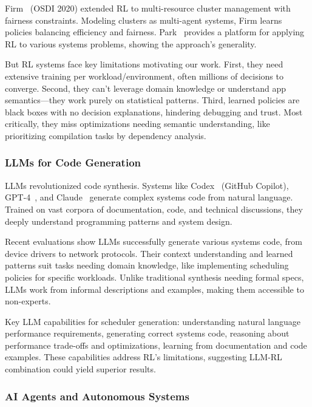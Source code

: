 Firm~\cite{qiu2020firm} (OSDI 2020) extended RL to multi-resource cluster management with fairness constraints. Modeling clusters as multi-agent systems, Firm learns policies balancing efficiency and fairness. Park~\cite{mao2019park} provides a platform for applying RL to various systems problems, showing the approach's generality.

But RL systems face key limitations motivating our work. First, they need extensive training per workload/environment, often millions of decisions to converge. Second, they can't leverage domain knowledge or understand app semantics—they work purely on statistical patterns. Third, learned policies are black boxes with no decision explanations, hindering debugging and trust. Most critically, they miss optimizations needing semantic understanding, like prioritizing compilation tasks by dependency analysis.

\subsubsection{LLMs for Code Generation}

LLMs revolutionized code synthesis. Systems like Codex~\cite{chen2021codex} (GitHub Copilot), GPT-4~\cite{openai2023gpt4}, and Claude~\cite{anthropic2024claude} generate complex systems code from natural language. Trained on vast corpora of documentation, code, and technical discussions, they deeply understand programming patterns and system design.

Recent evaluations show LLMs successfully generate various systems code, from device drivers to network protocols. Their context understanding and learned patterns suit tasks needing domain knowledge, like implementing scheduling policies for specific workloads. Unlike traditional synthesis needing formal specs, LLMs work from informal descriptions and examples, making them accessible to non-experts.

Key LLM capabilities for scheduler generation: understanding natural language performance requirements, generating correct systems code, reasoning about performance trade-offs and optimizations, learning from documentation and code examples. These capabilities address RL's limitations, suggesting LLM-RL combination could yield superior results.

\subsubsection{AI Agents and Autonomous Systems}

